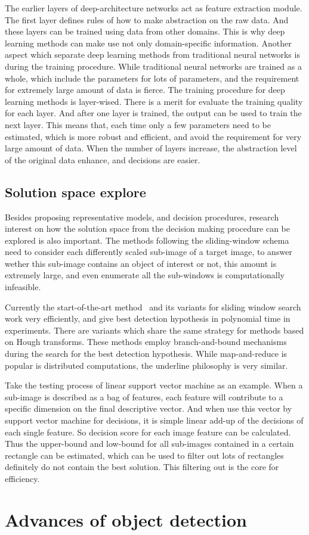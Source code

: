 The earlier layers of deep-architecture networks act as feature extraction module. The first layer defines rules of how to make abstraction on the raw data. And these layers can be trained using  data from other domains. This is why deep learning methods can make use not only domain-specific information. Another aspect which separate deep learning methods from traditional neural networks is during the training procedure. While traditional neural networks are trained as a whole, which include the parameters for lots of parameters, and the requirement for extremely large amount of data is fierce. The training procedure for deep learning methods is layer-wised. There is a merit for evaluate the training quality for each layer. And after one layer is trained, the output can be used to train the next layer. This means that, each time only a few parameters need to be estimated, which is more robust and efficient, and avoid the requirement for very large amount of data. When the number of layers increase, the abstraction level of the original data enhance, and decisions are easier.
\subsection{Solution space explore}
Besides proposing representative models, and decision procedures, research interest on how the solution space from the decision making procedure can be explored is also important. The methods following the sliding-window schema need to consider each differently scaled sub-image of a target image, to answer wether this sub-image contains an object of interest or not, this amount is extremely large, and even enumerate all the sub-windows is computationally infeasible.

Currently the start-of-the-art method~\cite{ij15} and its variants\cite{drl1,drl2} for sliding window search work very efficiently, and give best detection hypothesis in polynomial time in experiments. There are variants\cite{ac27} which share the same strategy for methods based on Hough transforms. These methods employ branch-and-bound mechanisms during the search for the best detection hypothesis. While map-and-reduce is popular is distributed computations, the underline philosophy is very similar. 

Take the testing process of linear support vector machine as an example. When a sub-image is described as a bag of features, each feature will contribute to a specific dimension on the final descriptive vector.
And when use this vector by support vector machine for decisions, it is simple linear add-up of the decisions of each single feature. So decision score for each image feature can be calculated. Thus the upper-bound and low-bound for all sub-images contained in a certain rectangle can be estimated, which can be used to filter out lots of rectangles definitely do not contain the best solution. This filtering out is the core for efficiency. 

\section{Advances of object detection}

